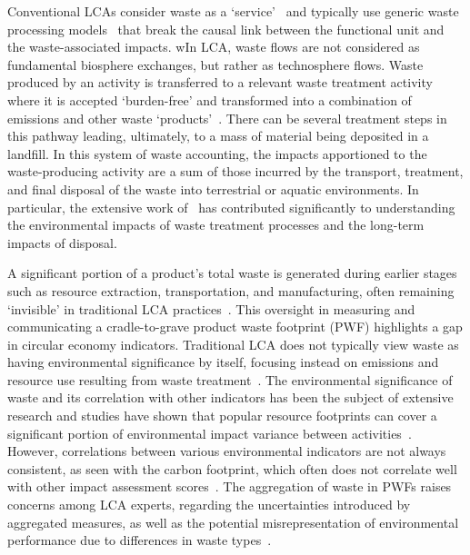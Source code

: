 Conventional LCAs consider waste as a `service'~\citep{guinee2021wasteisnotaservice} and typically use generic waste processing models~\citep{beylot2018} that break the causal link between the functional unit and the waste-associated impacts. wIn LCA, waste flows are not considered as fundamental biosphere exchanges, but rather as technosphere flows. Waste produced by an activity is transferred to a relevant waste treatment activity where it is accepted `burden-free' and transformed into a combination of emissions and other waste `products'~\citep{guinee2021wasteisnotaservice}. There can be several treatment steps in this pathway leading, ultimately, to a mass of material being deposited in a landfill. In this system of waste accounting, the impacts apportioned to the waste-producing activity are a sum of those incurred by the transport, treatment, and final disposal of the waste into terrestrial or aquatic environments. In particular, the extensive work of~\cite{doka2024publications} has contributed significantly to understanding the environmental impacts of waste treatment processes and the long-term impacts of disposal.

A significant portion of a product's total waste is generated during earlier stages such as resource extraction, transportation, and manufacturing, often remaining `invisible' in traditional LCA practices~\citep{laurenti2016wastefootprint}. This oversight in measuring and communicating a cradle-to-grave product waste footprint (PWF) highlights a gap in circular economy indicators. Traditional LCA does not typically view waste as having environmental significance by itself, focusing instead on emissions and resource use resulting from waste treatment~\cite{bisinella2024wastelca, laurenti2023wastefootprint}. The environmental significance of waste and its correlation with other indicators has been the subject of extensive research and studies have shown that popular resource footprints can cover a significant portion of environmental impact variance between activities~\citep{steinmann2017resourcefootprints}. However, correlations between various environmental indicators are not always consistent, as seen with the carbon footprint, which often does not correlate well with other impact assessment scores~\citep{laurenti2012carbonfootprint}. The aggregation of waste in PWFs raises concerns among LCA experts, regarding the uncertainties introduced by aggregated measures, as well as the potential misrepresentation of environmental performance due to differences in waste types~\citep{chen2021methoduncertainty,huijbregts2010energyfootprint}.

